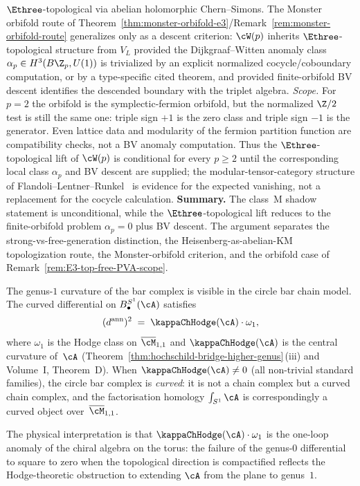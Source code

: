 \begin{remark}
$\Ethree$-topological via abelian holomorphic Chern--Simons.
The Monster orbifold route of
Theorem~\ref{thm:monster-orbifold-e3}/Remark~\ref{rem:monster-orbifold-route}
generalizes only as a descent criterion: $\cW(p)$ inherits
$\Ethree$-topological structure from $V_L$ provided the
Dijkgraaf--Witten anomaly class
$\alpha_p\in H^3(B\Z_p,U(1))$ is trivialized by an explicit normalized
cocycle/coboundary computation, or by a type-specific cited theorem,
and provided finite-orbifold BV descent identifies the descended
boundary with the triplet algebra. \emph{Scope.} For $p=2$ the
orbifold is the symplectic-fermion orbifold, but the normalized
$\Z/2$ test is still the same one: triple sign \(+1\) is the zero
class and triple sign \(-1\) is the generator. Even lattice data and
modularity of the fermion partition function are compatibility checks,
not a BV anomaly computation. Thus the $\Ethree$-topological lift of
$\cW(p)$ is conditional for every $p\ge 2$ until the corresponding
local class \(\alpha_p\) and BV descent are supplied; the
modular-tensor-category structure of
Flandoli--Lentner--Runkel~\cite{FlandoliLentner18} is evidence for the
expected vanishing, not a replacement for the cocycle calculation.
\textbf{Summary.} The class~M shadow statement is unconditional, while
the $\Ethree$-topological lift reduces to the finite-orbifold problem
\(\alpha_p=0\) plus BV descent. The argument separates the
strong-vs-free-generation distinction, the Heisenberg-as-abelian-KM
topologization route, the Monster-orbifold criterion, and the orbifold
case of Remark~\ref{rem:E3-top-free-PVA-scope}.
\end{remark}

\begin{remark}%
\label{rem:circle-bar-curvature}%
%
The genus-$1$ curvature of the bar complex is visible
in the circle bar chain model.
The curved differential on
$B^{S^1}_\bullet(\cA)$ satisfies
\begin{equation}\label{eq:circle-bar-curvature}
(d^{\mathrm{ann}})^2 \;=\; \kappaChHodge(\cA)\cdot\omega_1,
\end{equation}
where $\omega_1$ is the Hodge class on
$\overline{\cM}_{1,1}$ and $\kappaChHodge(\cA)$ is the central
curvature of~$\cA$
(Theorem~\ref{thm:hochschild-bridge-higher-genus}\,(iii)
and Volume~I, Theorem~D).
When $\kappaChHodge(\cA)\neq 0$ (all non-trivial standard
families), the circle bar complex is \emph{curved}:
it is not a chain complex but a curved chain complex,
and the factorisation homology
$\int_{S^1}\cA$ is correspondingly a curved object
over~$\overline{\cM}_{1,1}$.

The physical interpretation is that
$\kappaChHodge(\cA)\cdot\omega_1$ is the one-loop anomaly of
the chiral algebra on the torus: the failure of the
genus-$0$ differential to square to zero when the
topological direction is compactified reflects the
Hodge-theoretic obstruction to extending $\cA$
from the plane to genus~$1$.
\end{remark}

